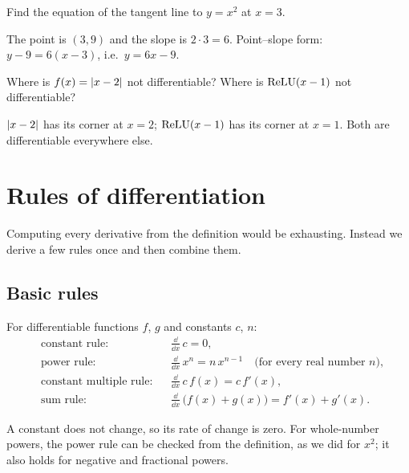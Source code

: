 \begin{exercise}
Find the equation of the tangent line to $y = x^2$ at $x = 3$.
\end{exercise}
\begin{solution}
The point is $(3, 9)$ and the slope is $2\cdot3 = 6$. Point--slope form:
$y - 9 = 6(x - 3)$, i.e.\ $y = 6x - 9$.
\end{solution}

\begin{exercise}
Where is $f(x) = \lvert x - 2\rvert$ not differentiable? Where is $\operatorname{ReLU}(x - 1)$ not
differentiable?
\end{exercise}
\begin{solution}
$\lvert x - 2\rvert$ has its corner at $x = 2$; $\operatorname{ReLU}(x - 1)$ has its corner at
$x = 1$. Both are differentiable everywhere else.
\end{solution}

\section{Rules of differentiation}\label{sec:diff-rules}

Computing every derivative from the definition would be exhausting. Instead we
derive a few rules once and then combine them.

\subsection{Basic rules}

\begin{theorem}\label{thm:basic-rules}
For differentiable functions $f$, $g$ and constants $c$, $n$:
\begin{align*}
  &\text{constant rule:} && \tfrac{\dd}{\dd x}\,c = 0,\\
  &\text{power rule:} && \tfrac{\dd}{\dd x}\,x^n = n\,x^{n-1}
    \quad\text{(for every real number } n\text{)},\\
  &\text{constant multiple rule:} && \tfrac{\dd}{\dd x}\,c\,f(x) = c\,f'(x),\\
  &\text{sum rule:} && \tfrac{\dd}{\dd x}\,\bigl(f(x) + g(x)\bigr)
    = f'(x) + g'(x).
\end{align*}
\end{theorem}

A constant does not change, so its rate of change is zero. For whole-number
powers, the power rule can be checked from the definition, as we did for
$x^2$; it also holds for negative and fractional powers.

